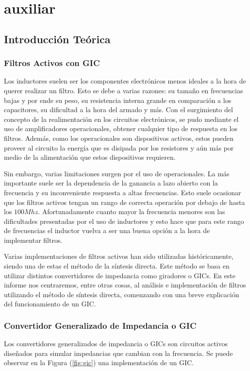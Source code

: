 \documentclass[a4paper]{article}
\begin{document}
\tableofcontents
\break
\section{auxiliar}

\subsection{Introducción Teórica}

\subsubsection{Filtros Activos con GIC}

Los inductores suelen ser los componentes electrónicos menos ideales a la hora de querer realizar un filtro. Esto se debe a varias razones: su tamaño en frecuencias bajas y por ende su peso, su resistencia interna grande en comparación a los capacitores, su dificultad a la hora del armado y más. Con el surgimiento del concepto de la realimentación en los circuitos electrónicos, se pudo mediante el uso de amplificadores operacionales, obtener cualquier tipo de respuesta en los filtros. Además, como los operacionales son dispositivos activos, estos pueden proveer al circuito la energía que es disipada por los resistores y aún más por medio de la alimentación que estos dispositivos requieren.

Sin embargo, varias limitaciones surgen por el uso de operacionales. La más importante suele ser la dependencia de la ganancia a lazo abierto con la frecuencia y su inconveniente respuesta a altas frecuencias. Esto suele ocasionar que los filtros activos tengan un rango de correcta operación por debajo de hasta los $100Mhz$. Afortunadamente cuanto mayor la frecuencia menores son las dificultades presentadas por el uso de inductores y esto hace que para este rango de frecuencias el inductor vuelva a ser una buena opción a la hora de implementar filtros.

Varias implementaciones de filtros activos han sido utilizadas históricamente, siendo una de estas el método de la síntesis directa. Este método se basa en utilizar distintos convertidores de impedancia como giradores o GICs. En este informe nos centraremos, entre otras cosas, al análisis e implementación de filtros utilizando el método de síntesis directa, comenzando con una breve explicación del funcionamiento de un GIC.

\subsubsection{Convertidor Generalizado de Impedancia o GIC}
Los convertidores generalizados de impedancia o GICs son circuitos activos diseñados para simular impedancias que cambian con la frecuencia. Se puede observar en la Figura (\ref{fig:gic}) una implementación de un GIC.
\end{document}
